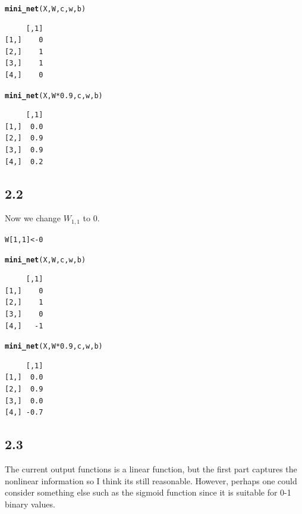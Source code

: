 \documentclass[10pt, a4paper, english]{article}\usepackage[]{graphicx}\usepackage[dvipsnames]{xcolor}
\makeatletter
\newcommand{\hlnum}[1]{\textcolor[rgb]{0.686,0.059,0.569}{#1}}%
\newcommand{\hlopt}[1]{\textcolor[rgb]{0,0,0}{#1}}%
\newcommand{\hlstd}[1]{\textcolor[rgb]{0.345,0.345,0.345}{#1}}%
\newcommand{\hlkwb}[1]{\textcolor[rgb]{0.69,0.353,0.396}{#1}}%
\newcommand{\hlkwd}[1]{\textcolor[rgb]{0.737,0.353,0.396}{\textbf{#1}}}%
\newenvironment{kframe}{%
 \def\at@end@of@kframe{}%
 \ifinner\ifhmode%
  \def\at@end@of@kframe{\end{minipage}}%
  \begin{minipage}{\columnwidth}%
 \fi\fi%
 \def\FrameCommand##1{\hskip\@totalleftmargin \hskip-\fboxsep
 \colorbox{shadecolor}{##1}\hskip-\fboxsep
     \hskip-\linewidth \hskip-\@totalleftmargin \hskip\columnwidth}%
 \MakeFramed {\advance\hsize-\width
   \@totalleftmargin\z@ \linewidth\hsize
   \@setminipage}}%
 {\par\unskip\endMakeFramed%
 \at@end@of@kframe}
\newenvironment{knitrout}{}{} %
\makeatother
\begin{document}
\begin{knitrout}
\color{fgcolor}\begin{kframe}
\begin{alltt}
\hlkwd{mini_net}\hlstd{(X, W, c, w, b)}
\end{alltt}
\begin{verbatim}
     [,1]
[1,]    0
[2,]    1
[3,]    1
[4,]    0
\end{verbatim}
\begin{alltt}
\hlkwd{mini_net}\hlstd{(X, W}\hlopt{*}\hlnum{0.9}\hlstd{, c, w, b)}
\end{alltt}
\begin{verbatim}
     [,1]
[1,]  0.0
[2,]  0.9
[3,]  0.9
[4,]  0.2
\end{verbatim}
\end{kframe}
\end{knitrout}
 
 \subsection{2.2}
 Now we change $W_{1,1}$ to 0.
 
\begin{knitrout}
\color{fgcolor}\begin{kframe}
\begin{alltt}
\hlstd{W[}\hlnum{1}\hlstd{,}\hlnum{1}\hlstd{]}\hlkwb{<-} \hlnum{0}

\hlkwd{mini_net}\hlstd{(X, W, c, w, b)}
\end{alltt}
\begin{verbatim}
     [,1]
[1,]    0
[2,]    1
[3,]    0
[4,]   -1
\end{verbatim}
\begin{alltt}
\hlkwd{mini_net}\hlstd{(X, W}\hlopt{*}\hlnum{0.9}\hlstd{, c, w, b)}
\end{alltt}
\begin{verbatim}
     [,1]
[1,]  0.0
[2,]  0.9
[3,]  0.0
[4,] -0.7
\end{verbatim}
\end{kframe}
\end{knitrout}
 \subsection{2.3}
 The current output functions is a linear function, but the first part captures the nonlinear information so I think its still reasonable. However, perhaps one could consider something else such as the sigmoid function since it is suitable for 0-1 binary values. 
\end{document}

